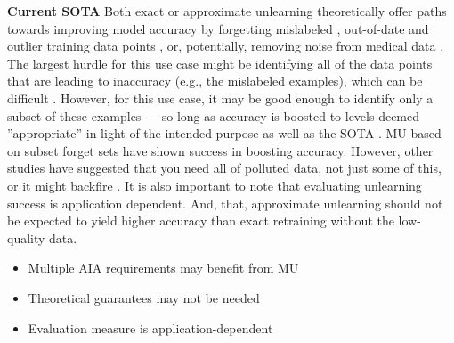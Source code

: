 \textbf{Current SOTA} Both exact or approximate unlearning theoretically offer paths towards improving model accuracy by forgetting mislabeled \citep{goel2023adversarialevaluationsinexactmachine,SUGIURA20242024DAT0002, 10.1145/3196494.3196517, chen2023unlearnwantforgetefficient, DBLP:conf/fgr/GundogduUU24}, out-of-date and outlier training data points \citep{kurmanji2023machineunlearninglearneddatabases, xu2024machineunlearningtraditionalmodels, Xu_2024, neel2024machineunlearning}, or, potentially, removing noise from medical data \citep{prelovznik2024improvingBrainMRI, dinsdale2020unlearningScannerBias}. The largest hurdle for this use case might be identifying all of the data points that are leading to inaccuracy (e.g., the mislabeled examples), which can be difficult \citep{goel2024correctivemachineunlearning}. However, for this use case, it may be good enough to identify only a subset of these examples --- so long as accuracy is boosted to levels deemed ''appropriate'' in light of the intended purpose as well as the SOTA \citep[Art. 15.1; Rec. 74]{european_union_ai_act_2024}. MU based on subset forget sets have shown success in boosting accuracy. However, other studies have suggested that you need all of polluted data, not just some of this, or it might backfire \citep{goel2024correctivemachineunlearning}. 
It is also important to note that evaluating unlearning success is application dependent. And, that, approximate unlearning should not be expected to yield higher accuracy than exact retraining without the low-quality data. 

\begin{tcolorbox}[colback=green!10,colframe=black!50,title=Key Points]
\begin{itemize}[leftmargin=0pt]
    \item Multiple AIA requirements may benefit from MU
    \item Theoretical guarantees may not be needed 
    \item Evaluation measure is application-dependent
\end{itemize}
\end{tcolorbox}


